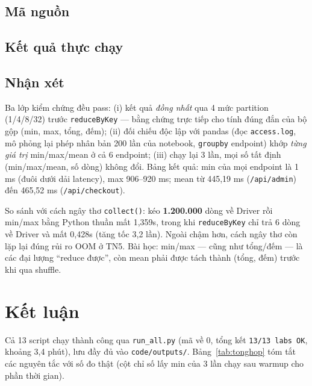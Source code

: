\documentclass[12pt,a4paper,oneside]{article}
\begin{document}
\subsection{Mã nguồn}



\subsection{Kết quả thực chạy}



\subsection{Nhận xét}

Ba lớp kiểm chứng đều pass: (i) kết quả \emph{đồng nhất} qua 4 mức partition (1/4/8/32) trước \texttt{reduceByKey} --- bằng chứng trực tiếp cho tính đúng đắn của bộ gộp (min, max, tổng, đếm); (ii) đối chiếu độc lập với pandas (đọc \texttt{access.log}, mô phỏng lại phép nhân bản 200 lần của notebook, \texttt{groupby} endpoint) khớp \emph{từng giá trị} min/max/mean ở cả 6 endpoint; (iii) chạy lại 3 lần, mọi số tất định (min/max/mean, số dòng) không đổi. Bảng kết quả: min của mọi endpoint là 1 ms (đuôi dưới dải latency), max 906--920 ms; mean từ 445,19 ms (\texttt{/api/admin}) đến 465,52 ms (\texttt{/api/checkout}).

So sánh với cách ngây thơ \texttt{collect()}: kéo \textbf{1.200.000} dòng về Driver rồi min/max bằng Python thuần mất 1,359s, trong khi \texttt{reduceByKey} chỉ trả 6 dòng về Driver và mất 0,428s (tăng tốc 3,2 lần). Ngoài chậm hơn, cách ngây thơ còn lặp lại đúng rủi ro OOM ở TN5. Bài học: min/max --- cũng như tổng/đếm --- là các đại lượng ``reduce được'', còn mean phải được tách thành (tổng, đếm) trước khi qua shuffle.

\section{Kết luận}
\label{sec:ketluan}

Cả 13 script chạy thành công qua \texttt{run\_all.py} (mã về 0, tổng kết \texttt{13/13 labs OK}, khoảng 3,4 phút), lưu đầy đủ vào \texttt{code/outputs/}. Bảng~\ref{tab:tonghop} tóm tắt các nguyên tắc với số đo thật (cột chỉ số lấy min của 3 lần chạy sau warmup cho phần thời gian).
\end{document}
